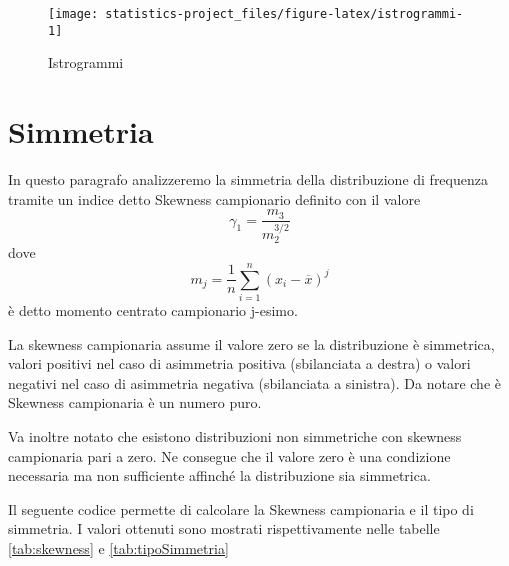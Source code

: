 \documentclass[]{book}
\begin{document}
\begin{figure}

{\centering \texttt{[image: statistics-project\_files/figure-latex/istrogrammi-1]} 

}

\caption{Istrogrammi}\label{fig:istrogrammi}
\end{figure}

\section{Simmetria}\label{simmetria}

In questo paragrafo analizzeremo la simmetria della distribuzione di
frequenza tramite un indice detto Skewness campionario definito con il
valore \[\gamma_1=\frac{m_3}{m_2^{3/2}} \] dove
\[m_j = \frac{1}{n}\sum_{i=1}^{n}(x_i-\overline{x})^j\] è detto momento
centrato campionario j-esimo.

La skewness campionaria assume il valore zero se la distribuzione è
simmetrica, valori positivi nel caso di asimmetria positiva (sbilanciata
a destra) o valori negativi nel caso di asimmetria negativa (sbilanciata
a sinistra). Da notare che è Skewness campionaria è un numero puro.

Va inoltre notato che esistono distribuzioni non simmetriche con
skewness campionaria pari a zero. Ne consegue che il valore zero è una
condizione necessaria ma non sufficiente affinché la distribuzione sia
simmetrica.

Il seguente codice permette di calcolare la Skewness campionaria e il
tipo di simmetria. I valori ottenuti sono mostrati rispettivamente nelle
tabelle \ref{tab:skewness} e \ref{tab:tipoSimmetria}
\end{document}
